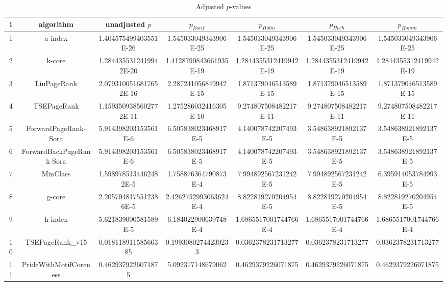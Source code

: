 \documentclass[a4paper,10pt]{article}
\begin{document}
\begin{landscape}
\begin{table}[!htp]
\centering\tiny
\caption{Adjusted $p$-values}
\begin{tabular}{ccccccc}
i&algorithm&unadjusted $p$&$p_{Bonf}$&$p_{Holm}$&$p_{Hoch}$&$p_{Homm}$\\
\hline
1&a-index&1.404575499403551E-26&1.545033049343906E-25&1.545033049343906E-25&1.545033049343906E-25&1.545033049343906E-25\\
2&k-core&1.2844355312419942E-20&1.4128790843661935E-19&1.2844355312419942E-19&1.2844355312419942E-19&1.2844355312419942E-19\\
3&LiuPageRank&2.0793100516817652E-16&2.287241056849942E-15&1.871379046513589E-15&1.871379046513589E-15&1.871379046513589E-15\\
4&TSEPageRank&1.1593509385602772E-11&1.275286032416305E-10&9.274807508482217E-11&9.274807508482217E-11&9.274807508482217E-11\\
5&ForwardPageRank-Sora&5.914398203153561E-6&6.505838023468917E-5&4.140078742207493E-5&3.548638921892137E-5&3.548638921892137E-5\\
6&ForwardBackPageRank-Sora&5.914398203153561E-6&6.505838023468917E-5&4.140078742207493E-5&3.548638921892137E-5&3.548638921892137E-5\\
7&MinClass&1.5989785134462482E-5&1.758876364790873E-4&7.994892567231242E-5&7.994892567231242E-5&6.395914053784993E-5\\
8&g-core&2.2057048175512386E-5&2.4262752993063624E-4&8.822819270204954E-5&8.822819270204954E-5&8.822819270204954E-5\\
9&h-index&5.621839000581589E-5&6.184022900639748E-4&1.6865517001744766E-4&1.6865517001744766E-4&1.6865517001744766E-4\\
10&TSEPageRank_v15&0.01811891158566385&0.19930802744230233&0.0362378231713277&0.0362378231713277&0.0362378231713277\\
11&PrideWithMotifCoreness&0.4629379226071875&5.092317148679062&0.4629379226071875&0.4629379226071875&0.4629379226071875\\
\hline
\end{tabular}
\end{table}


\end{landscape}
\end{document}
